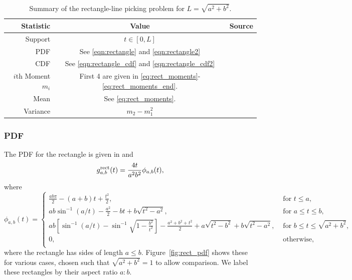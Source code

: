 \begin{table}[ht]
  \centering
  \begin{tabular}{|r|c|l|}
    \hline
    Statistic & Value & Source \\ 
    \hline
      Support            & $t \in [0, L]$ & \\
      PDF                & See \eqref{eqn:rectangle} and \eqref{eqn:rectangle2}   &
                             \cite{b.ghosh51:_random_rect,mathai_geom} \\
      CDF                & See \eqref{eqn:rectangle_cdf} and \eqref{eqn:rectangle_cdf2} & 
                             \cite{} \\
      $i$th Moment $m_i$ & First 4 are given in
      \eqref{eq:rect_moments}-\eqref{eq:rect_moments_end}. 
                        & \cite{b.ghosh51:_random_rect} \\
      Mean               & See \eqref{eq:rect_moments}. &
                             \cite{} \\[1.5ex]
      Variance           & $\displaystyle m_2 - m_1^2$ &
                             \cite{} \\[1.5ex]
    \hline
  \end{tabular}
  \caption{Summary of the rectangle-line picking problem for $L=\sqrt{a^2+b^2}$.}
  \label{tab:summary_line}
\end{table}

\subsubsection{PDF}

The PDF for the rectangle is given in 
\cite[Theorem 2.4.4]{mathai_geom} and 
\cite[Theorem 2]{b.ghosh51:_random_rect}
\begin{equation}
  g^{\rm rect}_{a,b}(t) = \frac{4 t}{a^2 b^2} \phi_{a,b}(t),
  \label{eqn:rectangle}   
\end{equation}
where
\begin{equation}
  \phi_{a,b}(t) = \left\{
    \begin{array}{ll}
      \frac{ab \pi}{2} - (a+b) t + \frac{t^2}{2}, 
         & \mbox{ for } t \leq a, \\
      a b \sin^{-1} (a/t) - \frac{a^2}{2} - b t + b\sqrt{t^2 - a^2},
         & \mbox{ for } a \leq t \leq b, \\
      a b \left[ \sin^{-1} (a/t) - \sin^{-1} \sqrt{1 - \frac{b^2}{t^2}} \right]
        - \frac{a^2 + b^2 + t^2}{2} 
        + a\sqrt{t^2 - b^2}+ b\sqrt{t^2 - a^2},
         & \mbox{ for } b \leq t \leq \sqrt{a^2 + b^2}, \\
      0,
         & \mbox{ otherwise}, \\
    \end{array} \right. 
  \label{eqn:rectangle2}   
\end{equation}
where the rectangle has sides of length $a \leq
b$. Figure~\ref{fig:rect_pdf} shows these for various cases, chosen
such that $\sqrt{a^2 + b^2} = 1$ to allow comparison. We label these
rectangles by their aspect ratio $a: b$.

